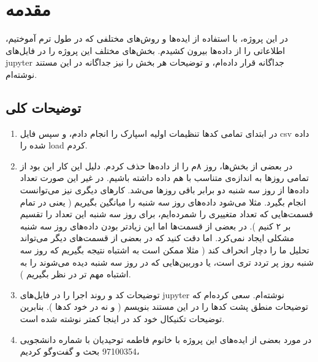 \section{مقدمه}
در این پروژه، با استفاده از ایده‌ها و روش‌های مختلفی که در طول ترم آموختیم، 
اطلاعاتی را از داده‌ها بیرون کشیدم. بخش‌های مختلف این پروژه را در فایل‌های 
jupyter
جداگانه قرار داده‌ام، و توضیحات هر بخش را نیز جداگانه در این مستند نوشته‌‌ام. 


\subsection{توضیحات کلی}

\begin{enumerate}
	\item 
	در ابتدای تمامی کدها تنظیمات اولیه اسپارک را انجام دادم، و سپس فایل 
	csv
	داده شده را 
	load
	کردم. 

	\item 
	در بعضی از بخش‌ها، روز ۸م را از داده‌ها حذف کردم. دلیل این کار این بود از تمامی روز‌ها
	به اندازه‌ی متناسب با هم داده داشته باشیم. در غیر این صورت تعداد داده‌ها از روز سه شنبه 
	دو برابر باقی روز‌ها می‌شد. کار‌های دیگری نیز می‌توانست انجام بگیرد. مثلا می‌شود داده‌های روز سه شنبه را 
	میانگین بگیریم (
		یعنی در تمام قسمت‌هایی که تعداد متغییری را شمر‌ده‌ایم، برای روز سه شنبه این تعداد را 
		تقسیم بر ۲ کنیم
	). 
	در بعضی از قسمت‌ها اما این زیادتر بودن داده‌های روز سه شنبه مشکلی ایجاد نمی‌کرد. اما دقت 
	کنید که در بعضی‌ از قسمت‌های دیگر می‌تواند تحلیل ما را دچار انحراف کند (
		مثلا ممکن است به اشتباه نتیجه‌ بگیریم که روز سه شنبه روز پر تردد تری است، یا 
		دوربین‌هایی که در روز سه شنبه دیده‌ می‌شوند را به اشتباه مهم تر در نظر بگیریم
	). 

	\item 
	توضیحات کد و روند اجرا را در فایل‌های 
	jupyter
	نوشته‌ام. سعی کرده‌ام که توضیحات منطق پشت کد‌ها را در این مستند بنویسم (
		و نه در خود کد‌ها
	). 
	بنابرین توضیحات تکنیکال خود کد در اینجا کمتر نوشته شده است. 

	\item 
	در مورد بعضی از ایده‌های این پروژه با خانوم فاطمه توحیدیان با شماره دانشجویی
	97100354
	بحث و گفت‌و‌گو کردیم،
\end{enumerate}


